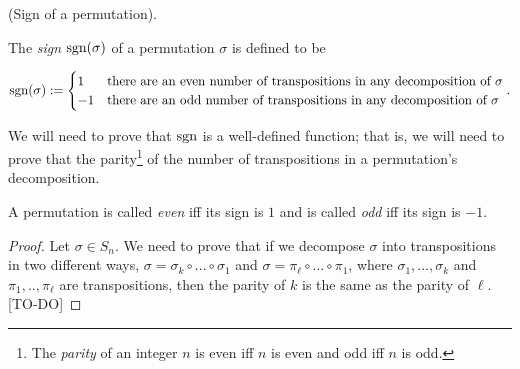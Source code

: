 \begin{defn}
    (Sign of a permutation).
    
    The \textit{sign} $\text{sgn}(\sigma)$ of a permutation $\sigma$ is defined to be
    
    \begin{align*}
        \text{sgn}(\sigma) := 
        \begin{cases}
            1 & \text{there are an even number of transpositions in any decomposition of $\sigma$} \\
            -1 & \text{there are an odd number of transpositions in any decomposition of $\sigma$}
        \end{cases}.
    \end{align*}
    
    We will need to prove that $\text{sgn}$ is a well-defined function; that is, we will need to prove that the parity\footnote{The \textit{parity} of an integer $n$ is even iff $n$ is even and odd iff $n$ is odd.} of the number of transpositions in a permutation's decomposition.

    A permutation is called \textit{even} iff its sign is $1$ and is called \textit{odd} iff its sign is $-1$.
\end{defn}

\begin{proof}
    Let $\sigma \in S_n$. We need to prove that if we decompose $\sigma$ into transpositions in two different ways, $\sigma = \sigma_k \circ ... \circ \sigma_1$ and $\sigma = \pi_\ell \circ ... \circ \pi_1$, where $\sigma_1, ..., \sigma_k$ and $\pi_1, .., \pi_\ell$ are transpositions, then the parity of $k$ is the same as the parity of $\ell$. [TO-DO]
\end{proof}

